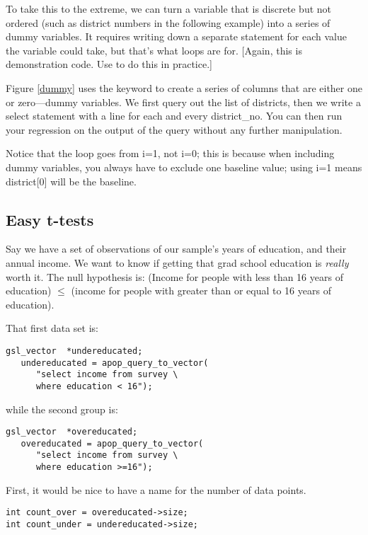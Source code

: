 To take this to the extreme, we can turn a variable that is discrete
but not ordered (such as district numbers in the following example)
into a series of dummy variables. It requires writing down a separate
 statement for each value the variable could take, but
that's what  loops are for.  [Again, this is demonstration
code. Use  to do this in practice.]


Figure \ref{dummy} uses the  keyword to create a series of
columns that are either one or zero---dummy variables.  We first query
out the list of districts, then we write a select statement with a line
 for each and
every district\_no. You can then run your regression on the output of
the query without any further manipulation.

Notice that the  loop goes from i=1, not i=0; this is because when
including dummy variables, you always have to exclude one baseline
value; using i=1 means district[0] will be the baseline.

\subsection{Easy t-tests}
Say we have a set of observations of our sample's years of education,
and their annual income. We want to know if getting that grad school
education is {\it really} worth it. The null hypothesis is: (Income for
people with less than 16 years of education) $\leq$ (income for people
with greater than or equal to 16 years of education).

That first data set is:
\begin{lstlisting}
gsl_vector	*undereducated;
   undereducated = apop_query_to_vector(
      "select income from survey \
      where education < 16");
\end{lstlisting}
while the second group is:
\begin{lstlisting}
gsl_vector	*overeducated;
   overeducated = apop_query_to_vector(
      "select income from survey \
      where education >=16");
\end{lstlisting}

First, it would be nice to have a name for the number of data points.
\begin{lstlisting}
int count_over = overeducated->size;
int count_under = undereducated->size;
\end{lstlisting}

